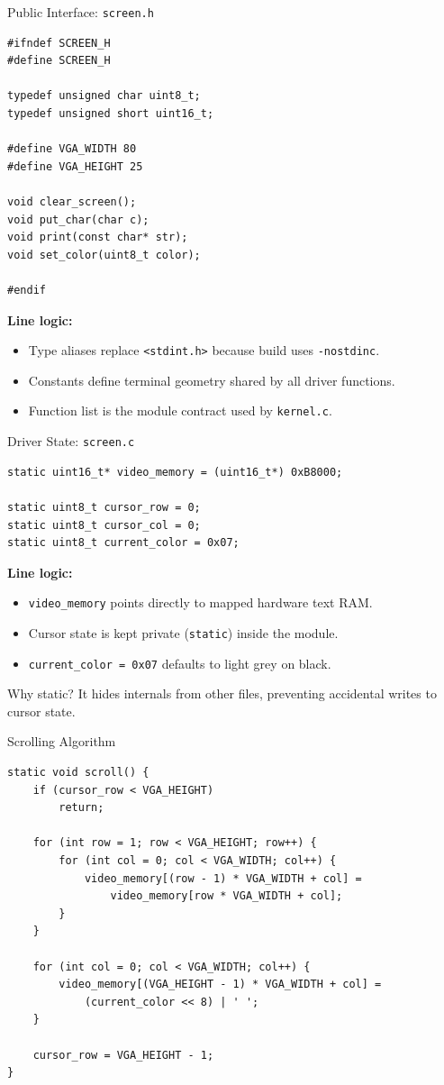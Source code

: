 \documentclass[aspectratio=169]{beamer}
\newcommand{\concept}[2]{%
  \begin{block}{#1}\smallskip #2\smallskip\end{block}\vspace{5pt}}
\begin{document}
\begin{frame}[fragile]{Public Interface: \texttt{screen.h}}
  \begin{lstlisting}[style=clang]
#ifndef SCREEN_H
#define SCREEN_H

typedef unsigned char uint8_t;
typedef unsigned short uint16_t;

#define VGA_WIDTH 80
#define VGA_HEIGHT 25

void clear_screen();
void put_char(char c);
void print(const char* str);
void set_color(uint8_t color);

#endif
  \end{lstlisting}
  \textbf{Line logic:}
  \begin{itemize}
    \item Type aliases replace \texttt{<stdint.h>} because build uses \texttt{-nostdinc}.
    \item Constants define terminal geometry shared by all driver functions.
    \item Function list is the module contract used by \texttt{kernel.c}.
  \end{itemize}
\end{frame}

\begin{frame}[fragile]{Driver State: \texttt{screen.c}}
  \begin{lstlisting}[style=clang]
static uint16_t* video_memory = (uint16_t*) 0xB8000;

static uint8_t cursor_row = 0;
static uint8_t cursor_col = 0;
static uint8_t current_color = 0x07;
  \end{lstlisting}
  \textbf{Line logic:}
  \begin{itemize}
    \item \texttt{video\_memory} points directly to mapped hardware text RAM.
    \item Cursor state is kept private (\texttt{static}) inside the module.
    \item \texttt{current\_color = 0x07} defaults to light grey on black.
  \end{itemize}
  \vspace{4pt}
  \concept{Why static?}{
    It hides internals from other files, preventing accidental writes to cursor state.
  }
\end{frame}

\begin{frame}[fragile]{Scrolling Algorithm}
  \begin{lstlisting}[style=clang]
static void scroll() {
    if (cursor_row < VGA_HEIGHT)
        return;

    for (int row = 1; row < VGA_HEIGHT; row++) {
        for (int col = 0; col < VGA_WIDTH; col++) {
            video_memory[(row - 1) * VGA_WIDTH + col] =
                video_memory[row * VGA_WIDTH + col];
        }
    }

    for (int col = 0; col < VGA_WIDTH; col++) {
        video_memory[(VGA_HEIGHT - 1) * VGA_WIDTH + col] =
            (current_color << 8) | ' ';
    }

    cursor_row = VGA_HEIGHT - 1;
}
  \end{lstlisting}
\end{frame}
\end{document}
